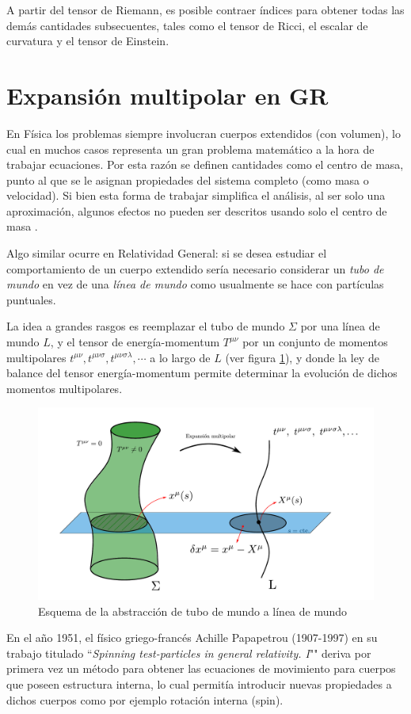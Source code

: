 A partir del tensor de Riemann, es posible contraer índices para obtener todas las demás cantidades subsecuentes, tales como el tensor de Ricci, el escalar de curvatura y el tensor de Einstein.

\section{Expansión multipolar en GR}

En Física los problemas siempre involucran cuerpos extendidos (con volumen), lo cual en muchos casos representa un gran problema matemático a la hora de trabajar ecuaciones. Por esta razón se definen cantidades como el centro de masa, punto al que se le asignan propiedades del sistema completo (como masa o velocidad). Si bien esta forma de trabajar simplifica el análisis, al ser solo una aproximación, algunos efectos no pueden ser descritos usando solo el centro de masa \cite{nataly}.

Algo similar ocurre en Relatividad General: si se desea estudiar el comportamiento de un cuerpo extendido sería necesario considerar un \textit{tubo de mundo} en vez de una \textit{línea de mundo} como usualmente se hace con partículas puntuales.

La idea a grandes rasgos es reemplazar el tubo de mundo $\Sigma$ por una línea de mundo $L$, y el tensor de energía-momentum $T^{\mu \nu}$ por un conjunto de momentos multipolares $t^{\mu \nu}, t^{\mu \nu \sigma}, t^{\mu \nu \sigma \lambda}, \cdots$ a lo largo de $L$ (ver figura \ref{fig:1}), y donde la ley de balance del tensor energía-momentum permite determinar la evolución de dichos momentos multipolares.
\begin{figure}[!ht]
	\centering
	\includegraphics[scale=0.45]{images/papapetrou.pdf}
	\caption[Expansión multipolar en RG]{Esquema de la abstracción de tubo de mundo a línea de mundo}
	\label{fig:1}
\end{figure}
En el año 1951, el físico griego-francés Achille Papapetrou (1907-1997) en su trabajo titulado ``\textit{Spinning test-particles in general relativity. I}"" \cite{Papapetrou2,Papapetrou1} deriva por primera vez un método para obtener las ecuaciones de movimiento para cuerpos que poseen estructura interna, lo cual permitía introducir nuevas propiedades a dichos cuerpos como por ejemplo rotación interna (spin). 

